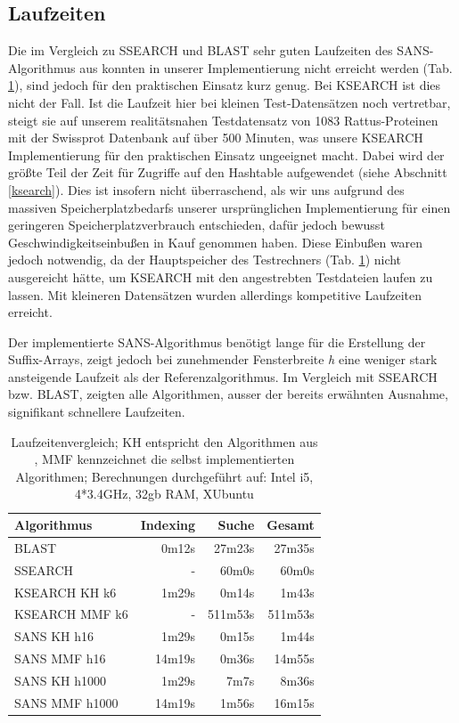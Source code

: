 \documentclass{article}
\begin{document}
\subsection{Laufzeiten}

Die im Vergleich zu SSEARCH und BLAST sehr guten Laufzeiten des SANS-Algorithmus aus \cite{Holm}
konnten in unserer Implementierung nicht erreicht werden (Tab. \ref{runtimes}), sind jedoch für den praktischen Einsatz kurz genug.
Bei KSEARCH ist dies nicht der Fall. Ist die Laufzeit hier bei kleinen Test-Datensätzen noch vertretbar, steigt sie auf unserem realitätsnahen
Testdatensatz von 1083 Rattus-Proteinen mit der Swissprot Datenbank auf über 500 Minuten, was unsere KSEARCH Implementierung für den
praktischen Einsatz ungeeignet macht. Dabei wird der größte Teil der Zeit für Zugriffe auf den Hashtable aufgewendet (siehe Abschnitt \ref{ksearch}). Dies ist insofern nicht
überraschend, als wir uns aufgrund des massiven Speicherplatzbedarfs unserer ursprünglichen Implementierung für einen geringeren
Speicherplatzverbrauch entschieden, dafür jedoch bewusst Geschwindigkeitseinbußen in Kauf genommen haben. Diese Einbußen waren jedoch notwendig, da der Hauptspeicher des Testrechners (Tab. \ref{runtimes}) nicht ausgereicht hätte, um KSEARCH mit den angestrebten Testdateien laufen zu lassen. Mit kleineren Datensätzen wurden allerdings kompetitive Laufzeiten erreicht.

Der implementierte SANS-Algorithmus benötigt lange für die Erstellung der Suffix-Arrays, zeigt jedoch bei zunehmender Fensterbreite \textit h 
eine weniger stark ansteigende Laufzeit als der Referenzalgorithmus.  Im Vergleich mit SSEARCH bzw. BLAST,  zeigten alle Algorithmen, ausser der bereits erwähnten Ausnahme, signifikant schnellere Laufzeiten.
  \begin{table}[h]
    \caption{Laufzeitenvergleich; KH entspricht den Algorithmen aus \cite{Holm}, MMF kennzeichnet die selbst implementierten Algorithmen; Berechnungen durchgeführt auf: Intel i5, 4*3.4GHz, 32gb RAM, XUbuntu}
    \begin{center}
    \begin{tabular}{lrrr}
    \hline
    Algorithmus & Indexing & Suche & Gesamt\\
    \hline
    BLAST & 0m12s & 27m23s & 27m35s\\
    SSEARCH & - & 60m0s & 60m0s\\
    KSEARCH KH k6 & 1m29s & 0m14s & 1m43s\\
    KSEARCH MMF k6 & -  & 511m53s & 511m53s\\
    SANS KH h16 & 1m29s &  0m15s & 1m44s\\
    SANS MMF  h16 & 14m19s & 0m36s & 14m55s\\
    SANS KH h1000 & 1m29s & 7m7s & 8m36s\\
    SANS MMF  h1000 & 14m19s & 1m56s & 16m15s\\
    \hline
    \end{tabular}
    \label{runtimes}
    \end{center}
  \end{table}
\end{document}
